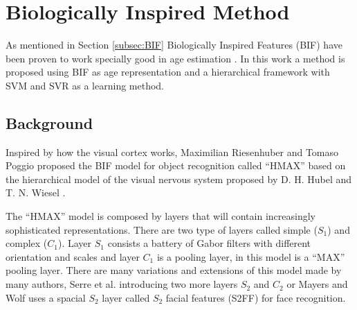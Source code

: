\section{Biologically Inspired Method}
As mentioned in Section \ref{subsec:BIF} Biologically Inspired Features (BIF) have been proven to work specially good in age estimation \cite{conf/cvpr/GuoMFH09}\cite{han:age}. In this work a method is proposed using BIF as age representation and a hierarchical framework with SVM and SVR as a learning method.
 
\subsection{Background}

Inspired by how the visual cortex works, Maximilian Riesenhuber and Tomaso Poggio \cite{Riesenhuber99hierarchicalmodels} proposed the BIF model for object recognition called ``HMAX'' based on the hierarchical model of the visual nervous system proposed by D. H. Hubel and T. N. Wiesel \cite{Hubel:62}. 

The ``HMAX'' model is composed by layers that will contain increasingly sophisticated representations. There are two type of layers called simple ($S_1$) and complex ($C_1$). Layer $S_1$ consists a battery of Gabor filters with different orientation and scales and layer $C_1$ is a pooling layer, in this model is a ``MAX'' pooling layer. There are many variations and extensions of this model made by many authors, Serre et al. \cite{4069258}\cite{1467551} introducing two more layers $S_2$ and $C_2$ or Mayers and Wolf \cite{Meyers:2008:UBI:1325290.1325298} uses a spacial $S_2$ layer called $S_2$ facial features (S2FF) for face recognition.


